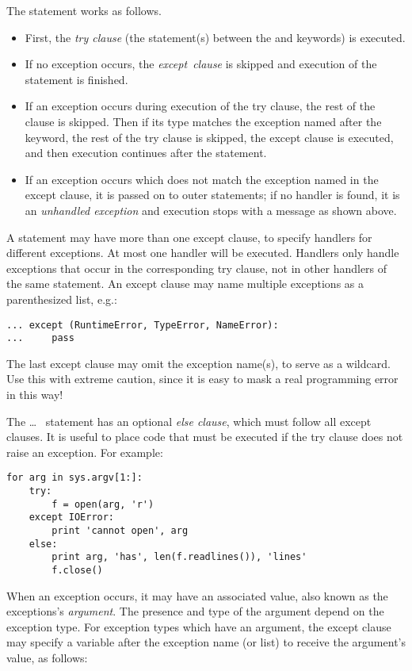 \documentclass{manual}
\begin{document}
The  statement works as follows.
\begin{itemize}
\item
First, the \emph{try clause}
(the statement(s) between the  and 
keywords) is executed.
\item
If no exception occurs, the
\emph{except\ clause}
is skipped and execution of the  statement is finished.
\item
If an exception occurs during execution of the try clause,
the rest of the clause is skipped.  Then if its type matches the
exception named after the  keyword, the rest of the
try clause is skipped, the except clause is executed, and then
execution continues after the  statement.
\item
If an exception occurs which does not match the exception named in the
except clause, it is passed on to outer  statements; if
no handler is found, it is an \emph{unhandled exception}
and execution stops with a message as shown above.
\end{itemize}
A  statement may have more than one except clause, to
specify handlers for different exceptions.
At most one handler will be executed.
Handlers only handle exceptions that occur in the corresponding try
clause, not in other handlers of the same  statement.
An except clause may name multiple exceptions as a parenthesized list,
e.g.:

\begin{verbatim}
... except (RuntimeError, TypeError, NameError):
...     pass
\end{verbatim}

The last except clause may omit the exception name(s), to serve as a
wildcard.
Use this with extreme caution, since it is easy to mask a real
programming error in this way!

The  \ldots\  statement has an optional
\emph{else clause}, which must follow all except clauses.  It is
useful to place code that must be executed if the try clause does not
raise an exception.  For example:

\begin{verbatim}
for arg in sys.argv[1:]:
    try:
        f = open(arg, 'r')
    except IOError:
        print 'cannot open', arg
    else:
        print arg, 'has', len(f.readlines()), 'lines'
        f.close()
\end{verbatim}


When an exception occurs, it may have an associated value, also known as
the exceptions's \emph{argument}.
The presence and type of the argument depend on the exception type.
For exception types which have an argument, the except clause may
specify a variable after the exception name (or list) to receive the
argument's value, as follows:
\end{document}
